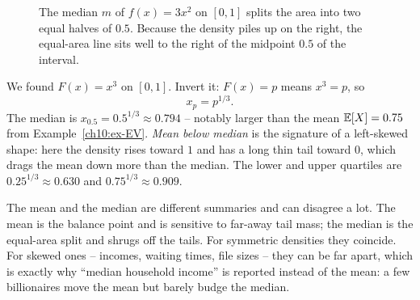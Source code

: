 \begin{figure}[H]
\centering
{}
\caption{The median $m$ of $f(x)=3x^2$ on $[0,1]$ splits the area into two equal
halves of $0.5$. Because the density piles up on the right, the equal-area line sits
well to the right of the midpoint $0.5$ of the interval.}
\label{ch10:fig-median}
\end{figure}

\begin{example}[Quantiles of $f=3x^2$]
\label{ch10:ex-quantile}
We found $F(x) = x^3$ on $[0,1]$. Invert it: $F(x)=p$ means $x^3 = p$, so
\[
  x_p = p^{1/3}.
\]
The median is $x_{0.5} = 0.5^{1/3} \approx 0.794$ -- notably larger than the mean
$\operatorname{\mathbb{E}}[X]=0.75$ from Example~\ref{ch10:ex-EV}. \emph{Mean below median} is the signature
of a left-skewed shape: here the density rises toward $1$ and has a long thin tail
toward $0$, which drags the mean down more than the median. The lower and upper
quartiles are $0.25^{1/3}\approx 0.630$ and $0.75^{1/3}\approx 0.909$.
\end{example}

\begin{trapbox}
The mean and the median are different summaries and can disagree a lot. The mean is
the balance point and is sensitive to far-away tail mass; the median is the
equal-area split and shrugs off the tails. For symmetric densities they coincide.
For skewed ones -- incomes, waiting times, file sizes -- they can be far apart, which
is exactly why ``median household income'' is reported instead of the mean: a few
billionaires move the mean but barely budge the median.
\end{trapbox}

